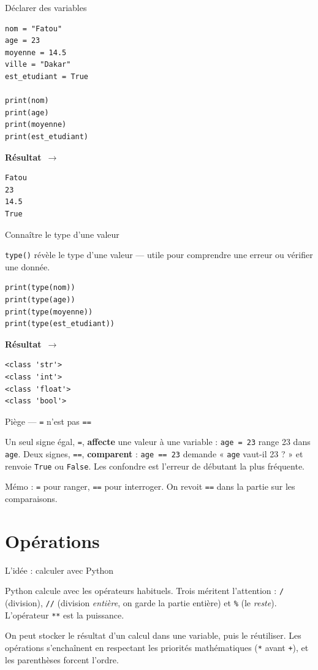 \documentclass[aspectratio=169,11pt]{beamer}
\newcommand{\resultat}{{\scriptsize\textbf{R\'esultat}~$\rightarrow$}\par\vspace{1pt}}
\begin{document}
\begin{frame}[fragile]{Déclarer des variables}
\begin{lstlisting}
nom = "Fatou"
age = 23
moyenne = 14.5
ville = "Dakar"
est_etudiant = True

print(nom)
print(age)
print(moyenne)
print(est_etudiant)
\end{lstlisting}
\resultat
\begin{lstlisting}[style=out]
Fatou
23
14.5
True
\end{lstlisting}
\end{frame}

\begin{frame}[fragile]{Connaître le type d'une valeur}
\begin{ucadex}
{\small \texttt{type()} révèle le type d'une valeur — utile pour comprendre une erreur ou vérifier une donnée.}
\end{ucadex}
\begin{lstlisting}
print(type(nom))
print(type(age))
print(type(moyenne))
print(type(est_etudiant))
\end{lstlisting}
\resultat
\begin{lstlisting}[style=out]
<class 'str'>
<class 'int'>
<class 'float'>
<class 'bool'>
\end{lstlisting}
\end{frame}

\begin{frame}{Piège — \texttt{=} n'est pas \texttt{==}}
\begin{ucadpiege}
{\small Un seul signe égal, \texttt{=}, \textbf{affecte} une valeur à une variable : \texttt{age = 23} range 23 dans \texttt{age}. Deux signes, \texttt{==}, \textbf{comparent} : \texttt{age == 23} demande « \texttt{age} vaut-il 23 ? » et renvoie \texttt{True} ou \texttt{False}. Les confondre est l'erreur de débutant la plus fréquente.}
\end{ucadpiege}
{\small Mémo : \texttt{=} pour ranger, \texttt{==} pour interroger. On revoit \texttt{==} dans la partie sur les comparaisons.}
\end{frame}

\section{Opérations}

\begin{frame}{L'idée : calculer avec Python}
\begin{ucaddef}
{\small Python calcule avec les opérateurs habituels. Trois méritent l'attention : \texttt{/} (division), \texttt{//} (division \emph{entière}, on garde la partie entière) et \texttt{\%} (le \emph{reste}). L'opérateur \texttt{**} est la puissance.}
\end{ucaddef}
{\small On peut stocker le résultat d'un calcul dans une variable, puis le réutiliser. Les opérations s'enchaînent en respectant les priorités mathématiques (\texttt{*} avant \texttt{+}), et les parenthèses forcent l'ordre.}
\end{frame}
\end{document}
